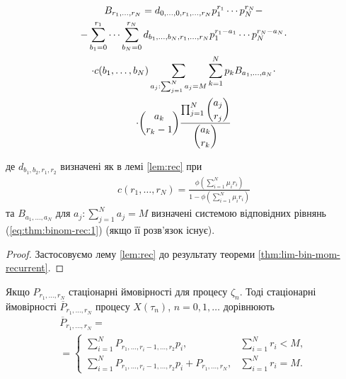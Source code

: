 \documentclass{KnuBulletin}
\begin{document}
\begin{multicols}{2}
\begin{corollary}
        \begin{multline*}
            \label{eq:thm:binom-rec:1}
            B_{r_1,\dots,r_N}
            = 
            d_{0,\dots,0,r_1,\dots,r_N}
            p_1^{r_1}\cdots
            p_N^{r_N}
            -\\-
            \sum_{b_1=0}^{r_1}
            \cdots
            \sum_{b_N=0}^{r_N}
            d_{b_1,\dots,b_N,r_1,\dots,r_N}
            p_1^{r_1-a_1}
            \cdots
            p_N^{r_N-a_N}
            \cdot\\\cdot
            c(b_1,\dots,b_N)
            \sum_{a_j: \sum_{j=1}^N a_j = M}
            \sum_{k=1}^N p_k
            B_{a_1,...,a_N}
            \cdot\\\cdot
            \dbinom{a_k}{r_k-1}
            \frac{\prod_{j=1}^N \dbinom{a_j}{r_j}} {\dbinom{a_k}{r_k}}
        \end{multline*} 
        
        де $d_{b_1,b_2,r_1,r_2}$ визначені як в лемі \ref{lem:rec} при
        \begin{gather*}
        c(r_1,\dots,r_N)=
        \frac
        { \phi\left(\sum_{i=1}^N \mu_i r_i\right)}
        {1- \phi\left(\sum_{i=1}^N \mu_i r_i\right)}        
        \end{gather*}
        та $B_{a_1,\dots,a_N}$ для $a_j: \sum_{j=1}^N a_j = M$ визначені системою 
        відповідних рівнянь (\ref{eq:thm:binom-rec:1}) (якщо її розв'язок існує).
    \end{corollary}
    \begin{proof}
        Застосовуємо лему \ref{lem:rec} до результату теореми \ref{thm:lim-bin-mom-recurrent}.
    \end{proof}
    
    
    \begin{lemma}
        Якщо $P_{r_1,\dots,r_N}$ стаціонарні ймовірності для процесу 
        $\zeta_n$.
        Тоді стаціонарні ймовірності $\overline{P}_{r_1,\dots,r_N}$ процесу $X(\tau_n)$, $n=0,1,\dots$ дорівнюють
        \begin{multline}
        \label{eq:X:stat:prob}
        \overline{P}_{r_1,\dots,r_N}
        =\\=
        \begin{cases}
        \sum_{i=1}^N P_{r_1,\dots,r_i-1,\dots,r_2} p_i, & \sum_{i=1}^N r_i<M, \\
        \sum_{i=1}^N P_{r_1,\dots,r_i-1,\dots,r_2} p_i+P_{r_1,\dots,r_N}, & \sum_{i=1}^N r_i=M.
        \end{cases}
        \end{multline}
    \end{lemma}


\end{multicols}
\end{document}
